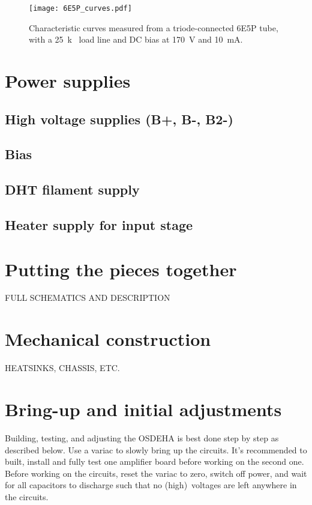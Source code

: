 \begin{figure}
\begin{center}
\texttt{[image: 6E5P\_curves.pdf]}
\caption{Characteristic curves measured from a triode-connected 6E5P tube, with a \SI{25}{k\Ohm} load line and DC bias at \SI{170}{V} and \SI{10}{mA}.}
\end{center}
\end{figure}


\section{Power supplies}

\subsection{High voltage supplies (B+, B-, B2-)}

\subsection{Bias}

\subsection{DHT filament supply}

\subsection{Heater supply for input stage}


\section{Putting the pieces together}

FULL SCHEMATICS AND DESCRIPTION




\section{Mechanical construction}

HEATSINKS, CHASSIS, ETC.


\section{Bring-up and initial adjustments}

Building, testing, and adjusting the OSDEHA is best done step by step as described below. Use a variac to slowly bring up the circuits. It's recommended to built, install and fully test one amplifier board before working on the second one. Before working on the circuits, reset the variac to zero, switch off power, and wait for all capacitors to discharge such that no (high) voltages are left anywhere in the circuits.

